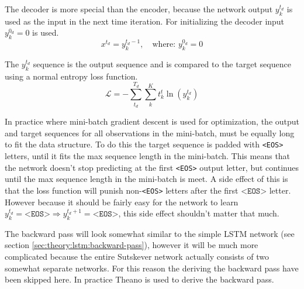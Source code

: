The decoder is more special than the encoder, because the network output $y_k^{t_d}$ is used as the input in the next time iteration. For initializing the decoder input $y_k^{0_d} = 0$ is used.
\begin{equation}
x^{t_d} = y_k^{t_d - 1}, \quad \text{where: } y_k^{0_d} = 0
\end{equation}

The $y_k^{t_d}$ sequence is the output sequence and is compared to the target sequence using a normal entropy loss function.
\begin{equation}
\mathcal{L} = - \sum_{t_d}^{T_d} \sum_{k}^K t_k^t \ln(y_k^{t_d})
\end{equation}

In practice where mini-batch gradient descent is used for optimization, the output and target sequences for all observations in the mini-batch, must be equally long to fit the data structure. To do this the target sequence is padded with \texttt{<EOS>} letters, until it fits the max sequence length in the mini-batch. This means that the network doesn't stop predicting at the first \texttt{<EOS>} output letter, but continues until the max sequence  length in the mini-batch is meet. A side effect of this is that the loss function will punish non-\texttt{<EOS>} letters after the first $\texttt{<EOS>}$ letter. However because it should be fairly easy for the network to learn $y_k^{t_d} = \texttt{<EOS>} \Rightarrow y_k^{t_d+1} = \texttt{<EOS>}$, this side effect shouldn't matter that much.

The backward pass will look somewhat similar to the simple LSTM network (see section \ref{sec:theory:lstm:backward-pass}), however it will be much more complicated because the entire Sutskever network actually consists of two somewhat separate networks. For this reason the deriving the backward pass have been skipped here. In practice Theano \cite{theano-a, theano-b} is used to derive the backward pass.
